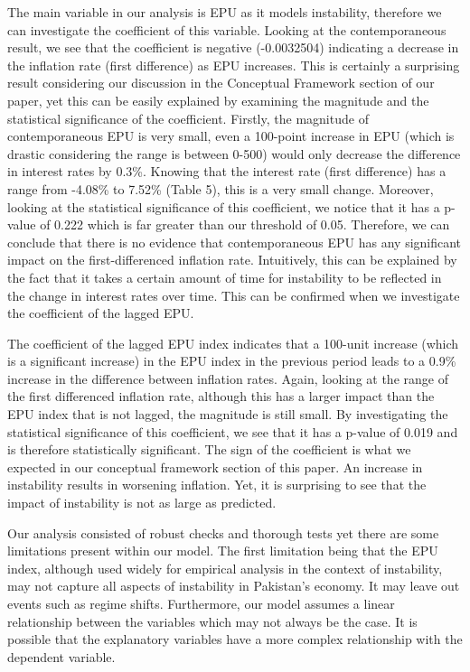 \documentclass[11pt]{article}
\begin{document}
The main variable in our analysis is EPU as it models instability, therefore we can investigate the coefficient of this variable. Looking at the contemporaneous result, we see that the coefficient is negative (-0.0032504) indicating a decrease in the inflation rate (first difference) as EPU increases. This is certainly a surprising result considering our discussion in the Conceptual Framework section of our paper, yet this can be easily explained by examining the magnitude and the statistical significance of the coefficient. Firstly, the magnitude of contemporaneous EPU is very small, even a 100-point increase in EPU (which is drastic considering the range is between 0-500) would only decrease the difference in interest rates by 0.3\%. Knowing that the interest rate (first difference) has a range from -4.08\% to 7.52\% (Table 5), this is a very small change. Moreover, looking at the statistical significance of this coefficient, we notice that it has a p-value of 0.222 which is far greater than our threshold of 0.05. Therefore, we can conclude that there is no evidence that contemporaneous EPU has any significant impact on the first-differenced inflation rate. Intuitively, this can be explained by the fact that it takes a certain amount of time for instability to be reflected in the change in interest rates over time. This can be confirmed when we investigate the coefficient of the lagged EPU. \newline

The coefficient of the lagged EPU index indicates that a 100-unit increase (which is a significant increase) in the EPU index in the previous period leads to a 0.9\% increase in the difference between inflation rates. Again, looking at the range of the first differenced inflation rate, although this has a larger impact than the EPU index that is not lagged, the magnitude is still small. By investigating the statistical significance of this coefficient, we see that it has a p-value of 0.019 and is therefore statistically significant. The sign of the coefficient is what we expected in our conceptual framework section of this paper. An increase in instability results in worsening inflation. Yet, it is surprising to see that the impact of instability is not as large as predicted. \newline

Our analysis consisted of robust checks and thorough tests yet there are some limitations present within our model. The first limitation being that the EPU index, although used widely for empirical analysis in the context of instability, may not capture all aspects of instability in Pakistan’s economy. It may leave out events such as regime shifts. Furthermore, our model assumes a linear relationship between the variables which may not always be the case. It is possible that the explanatory variables have a more complex relationship with the dependent variable. \newline
\end{document}
